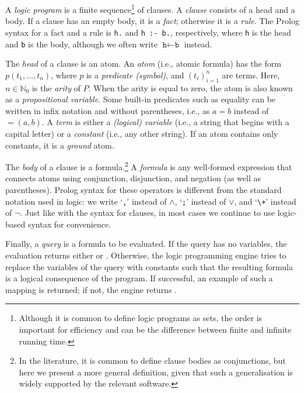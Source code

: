 A \emph{logic program} is a finite sequence\footnote{Although it is common to
  define logic programs as sets, the order is important for efficiency and can
  be the difference between finite and infinite running time.} of clauses. A
\emph{clause} consists of a head and a body. If a clause has an empty body, it
is a \emph{fact}; otherwise it is a \emph{rule}. The Prolog syntax for a fact
and a rule is \verb+h.+ and \verb+h :- b.+, respectively, where \texttt{h} is
the head and \texttt{b} is the body, although we often write
$\texttt{h} \gets \texttt{b}$ instead.

The \emph{head} of a clause is an atom. An \emph{atom} (i.e., atomic formula)
has the form $p(t_1, \dots, t_n)$, where $p$ is a \emph{predicate (symbol)}, and
${(t_i)}_{i=1}^n$ are terms. Here, $n \in \mathbb{N}_0$ is the \emph{arity} of
$P$. When the arity is equal to zero, the atom is also known as a
\emph{propositional variable}. Some built-in predicates such as equality can be
written in infix notation and without parentheses, i.e., as $a = b$ instead of
$=(a, b)$. A \emph{term} is either a \emph{(logical) variable} (i.e., a string
that begins with a capital letter) or a \emph{constant} (i.e., any other
string). If an atom contains only constants, it is a \emph{ground} atom.

The \emph{body} of a clause is a formula.\footnote{In the literature, it is
  common to define clause bodies as conjunctions, but here we present a more
  general definition, given that such a generalisation is widely supported by
  the relevant software.} A \emph{formula} is any well-formed expression that
connects atoms using conjunction, disjunction, and negation (as well as
parentheses). Prolog syntax for these operators is different from the standard
notation used in logic: we write `\verb+,+' instead of $\land$, `\verb+;+'
instead of $\lor$, and `\verb#\+#' instead of $\neg$. Just like with the syntax
for clauses, in most cases we continue to use logic-based syntax for
convenience.

Finally, a \emph{query} is a formula to be evaluated. If the query has no
variables, the evaluation returns either \true{} or \false{}. Otherwise, the
logic programming engine tries to replace the variables of the query with
constants such that the resulting formula is a logical consequence of the
program. If successful, an example of such a mapping is returned; if not, the
engine returns \false{}.

